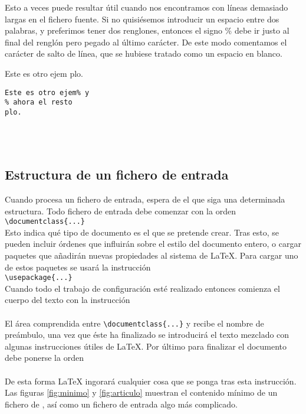 				Esto a veces puede resultar \'util cuando nos encontramos con l\'ineas demasiado largas en el fichero fuente. 
				Si no quisi\'esemos introducir un espacio entre dos palabras, y preferimos tener dos renglones, entonces el signo 
				\% debe ir justo al final del rengl\'on pero pegado al \'ultimo car\'acter. De este modo comentamos el car\'acter 
				de salto de l\'inea, que se hubiese tratado como un espacio en blanco.\\ 

\begin{minipage}{0,4\linewidth}
Este es otro ejem%
plo.
\end{minipage}
\hfill\begin{minipage}{0,5\linewidth}
\begin{verbatim}
Este es otro ejem% y
% ahora el resto
plo.
\end{verbatim}
\end{minipage}\\
\\

		\subsection{Estructura de un fichero de entrada}
		Cuando \LaTeXe{} procesa un fichero de entrada, espera de el que siga una determinada estructura. Todo 
		fichero de entrada debe comenzar con la orden\\ 
				\verb+\documentclass{...}+\\
		
		Esto indica qu\'e tipo de documento es el que se pretende crear. Tras esto, se pueden incluir \'ordenes que 
		influir\'an sobre el estilo del documento entero, o cargar paquetes que a\~nadir\'an nuevas propiedades al sistema 
		de \LaTeX{}. Para cargar uno de estos paquetes se usar\'a la instrucci\'on\\ 
				\verb+\usepackage{...}+\\
		Cuando todo el trabajo de configuraci\'on est\'e realizado entonces comienza el cuerpo del texto con la instrucci\'on\\
				\verb++\\
		El \'area comprendida entre \verb+\documentclass{...}+ y \verb++ recibe el nombre de pre\'ambulo, una 
		vez que \'este ha finalizado se introducir\'a el texto mezclado con algunas instrucciones \'utiles de \LaTeX{}. Por 
		\'ultimo para finalizar el documento debe ponerse la orden\\ 
				\verb++\\
		De esta forma \LaTeX{} ingorar\'a cualquier cosa que se ponga tras esta instrucci\'on. Las figuras \ref{fig:minimo} y
		\ref{fig:articulo} muestran el contenido m\'inimo de un fichero de \LaTeXe{}, as\'i como un fichero de entrada algo m\'as complicado.\\
	
